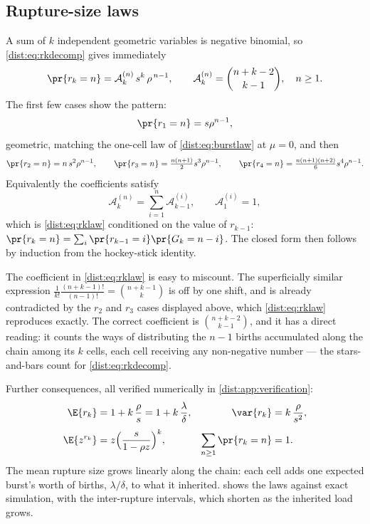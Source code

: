 \subsection{Rupture-size laws}
\label{dist:sec:rupture-sizes}

A sum of $k$ independent geometric variables is negative binomial, so
\cref{dist:eq:rkdecomp} gives immediately
\begin{equation}
\pr{r_k=n}=\mathcal{A}^{(n)}_{k}\,s^{k}\,\rho^{\,n-1},
\qquad
\mathcal{A}^{(n)}_{k}=\binom{n+k-2}{k-1},
\quad n\ge1.
\label{dist:eq:rklaw}
\end{equation}
The first few cases show the pattern:
\begin{equation}
\pr{r_1=n}=s\rho^{n-1},
\label{dist:eq:r1}
\end{equation}
geometric, matching the one-cell law of \cref{dist:eq:burstlaw} at $\mu=0$,
and then
\begin{equation}
\pr{r_2=n}=n\,s^2\rho^{n-1},
\qquad
\pr{r_3=n}=\tfrac{n(n+1)}{2}s^3\rho^{n-1},
\qquad
\pr{r_4=n}=\tfrac{n(n+1)(n+2)}{6}s^4\rho^{n-1}.
\label{dist:eq:r234}
\end{equation}
Equivalently the coefficients satisfy
\begin{equation}
\mathcal{A}^{(n)}_{k}=\sum_{i=1}^{n}\mathcal{A}^{(i)}_{k-1},
\qquad
\mathcal{A}^{(i)}_{1}=1,
\label{dist:eq:arec}
\end{equation}
which is \cref{dist:eq:rklaw} conditioned on the value of $r_{k-1}$:
$\pr{r_k=n}=\sum_i\pr{r_{k-1}=i}\pr{G_k=n-i}$. The closed form then follows
by induction from the hockey-stick identity.

\begin{remark}
\label{dist:rem:coefficient}
The coefficient in \cref{dist:eq:rklaw} is easy to miscount. The superficially
similar expression $\frac{1}{k!}\frac{(n+k-1)!}{(n-1)!}=\binom{n+k-1}{k}$ is
off by one shift, and is already contradicted by the $r_2$ and $r_3$ cases
displayed above, which \cref{dist:eq:rklaw} reproduces exactly. The correct
coefficient is $\binom{n+k-2}{k-1}$, and it has a direct reading: it counts
the ways of distributing the $n-1$ births accumulated along the chain among
its $k$ cells, each cell receiving any non-negative number --- the
stars-and-bars count for \cref{dist:eq:rkdecomp}.
\end{remark}

Further consequences, all verified numerically in
\cref{dist:app:verification}:
\begin{align}
\E{r_k}&=1+k\,\frac{\rho}{s}=1+k\,\frac{\lambda}{\delta},
&
\var{r_k}&=k\,\frac{\rho}{s^2},
\label{dist:eq:rkmoments}\\[0.3em]
\E{z^{r_k}}&=z\Bigl(\frac{s}{1-\rho z}\Bigr)^k,
&
\sum_{n\ge1}\pr{r_k=n}&=1 .
\label{dist:eq:rkgf}
\end{align}
The mean rupture size grows linearly along the chain: each cell adds one
expected burst's worth of births, $\lambda/\delta$, to what it inherited.
 shows the laws against exact simulation, with the
inter-rupture intervals, which shorten as the inherited load grows.

